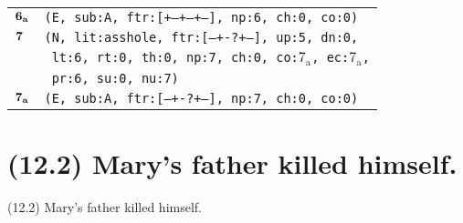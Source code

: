 \documentclass{article}
\begin{document}
\begin{minipage}{\textwidth}
{\begin{tabular}{|r|l|}
    ${\textbf{\textrm{6}}_{\textbf{\textrm{a}}}}$ & \texttt{\texttt{(E,~sub:A,~ftr:[+--+--+--],~np:6,~ch:0,~co:0)}} \\
    ${\textbf{\textrm{7}}_{\phantom{z}}}$ & \texttt{\texttt{(N,~lit:asshole,~ftr:[---+-?+--],~up:5,~dn:0,}} \\
    & \texttt{\texttt{~lt:6,~rt:0,~th:0,~np:7,~ch:0,~co:${\textrm{7}_{\textrm{a}}}$,~ec:${\textrm{7}_{\textrm{a}}}$,}} \\
    & \texttt{\texttt{~pr:6,~su:0,~nu:7)}} \\
    ${\textbf{\textrm{7}}_{\textbf{\textrm{a}}}}$ & \texttt{\texttt{(E,~sub:A,~ftr:[---+-?+--],~np:7,~ch:0,~co:0)}} \\
    \hline
  \end{tabular}
  }
\end{minipage}
\bigbreak

\clearpage

%
%

\section*{(12.2) Mary's father killed himself.}

\bigbreak
\begin{enumerate*}
\item[(12.2)] Mary's father killed himself.
\end{enumerate*}
\bigbreak
\end{document}
